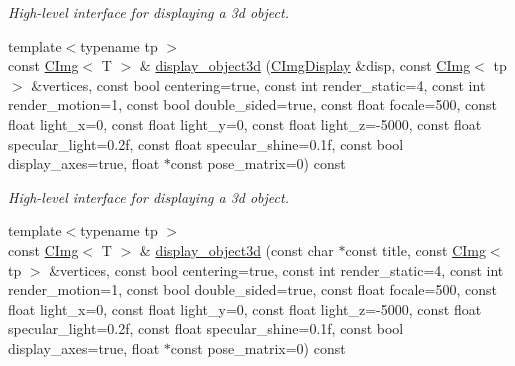 \begin{DoxyCompactItemize}
\begin{DoxyCompactList}\small\item\em High-\/level interface for displaying a 3d object. \item\end{DoxyCompactList}\item 
\hypertarget{structcimg__library_1_1CImg_a5348437494192ea42a61c0149a3226d8}{
{\footnotesize template$<$typename tp $>$ }\\const \hyperlink{structcimg__library_1_1CImg}{CImg}$<$ T $>$ \& \hyperlink{structcimg__library_1_1CImg_a5348437494192ea42a61c0149a3226d8}{display\_\-object3d} (\hyperlink{structcimg__library_1_1CImgDisplay}{CImgDisplay} \&disp, const \hyperlink{structcimg__library_1_1CImg}{CImg}$<$ tp $>$ \&vertices, const bool centering=true, const int render\_\-static=4, const int render\_\-motion=1, const bool double\_\-sided=true, const float focale=500, const float light\_\-x=0, const float light\_\-y=0, const float light\_\-z=-\/5000, const float specular\_\-light=0.2f, const float specular\_\-shine=0.1f, const bool display\_\-axes=true, float $\ast$const pose\_\-matrix=0) const }
\label{structcimg__library_1_1CImg_a5348437494192ea42a61c0149a3226d8}

\begin{DoxyCompactList}\small\item\em High-\/level interface for displaying a 3d object. \item\end{DoxyCompactList}\item 
\hypertarget{structcimg__library_1_1CImg_a1b9cfd8b99683d376ed4796d6cbb2e33}{
{\footnotesize template$<$typename tp $>$ }\\const \hyperlink{structcimg__library_1_1CImg}{CImg}$<$ T $>$ \& \hyperlink{structcimg__library_1_1CImg_a1b9cfd8b99683d376ed4796d6cbb2e33}{display\_\-object3d} (const char $\ast$const title, const \hyperlink{structcimg__library_1_1CImg}{CImg}$<$ tp $>$ \&vertices, const bool centering=true, const int render\_\-static=4, const int render\_\-motion=1, const bool double\_\-sided=true, const float focale=500, const float light\_\-x=0, const float light\_\-y=0, const float light\_\-z=-\/5000, const float specular\_\-light=0.2f, const float specular\_\-shine=0.1f, const bool display\_\-axes=true, float $\ast$const pose\_\-matrix=0) const }
\label{structcimg__library_1_1CImg_a1b9cfd8b99683d376ed4796d6cbb2e33}


\end{DoxyCompactItemize}
